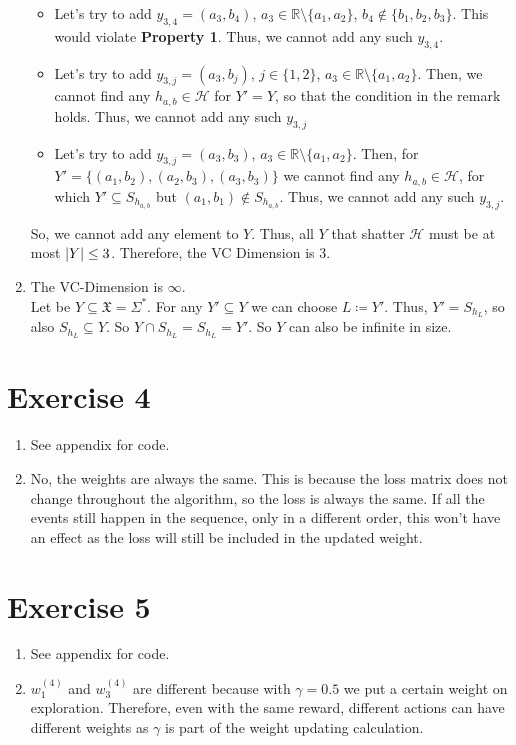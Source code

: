 \documentclass[12pt]{article}
\DeclarePairedDelimiter\abs{\lvert}{\rvert}
\begin{document}
\begin{enumerate}[label=(\alph*)]
\begin{itemize}
				\item	Let's try to add $y_{3,4} = (a_3, b_4)$, $a_3 \in \mathbb{R}\setminus\{a_1, a_2\}$, $b_4 \not\in \{b_1, b_2, b_3\}$. This would violate \textbf{Property 1}. Thus, we cannot add any such $y_{3,4}$.
				\item	Let's try to add $y_{3,j} = (a_3, b_j)$, $j \in \{1,2\}$, $a_3 \in \mathbb{R}\setminus\{a_1, a_2\}$. Then, we cannot find any $h_{a,b} \in \mathcal{H}$ for $Y' = Y$, so that the condition in the remark holds. Thus, we cannot add any such $y_{3,j}$
				\item	Let's try to add $y_{3,j} = (a_3, b_3)$, $a_3 \in \mathbb{R}\setminus\{a_1, a_2\}$. Then, for $Y' = \{(a_1, b_2), (a_2,b_3), (a_3, b_3)\}$ we cannot find any $h_{a,b} \in \mathcal{H}$, for which $Y' \subseteq S_{h_{a,b}}$ but $(a_1, b_1) \not\in S_{h_{a,b}}$. Thus, we cannot add any such $y_{3,j}$.
			\end{itemize}
			So, we cannot add any element to $Y$. Thus, all $Y$ that shatter $\mathcal{H}$ must be at most $\abs{Y} \leq 3$. Therefore, the VC Dimension is $3$.
	\item	The VC-Dimension is $\infty$. \\
			Let be $Y \subseteq \mathfrak{X} = \Sigma^*$. For any $Y' \subseteq Y$ we can choose $L \coloneqq Y'$. Thus, $Y' = S_{h_L}$, so also $S_{h_L} \subseteq Y$. So $Y \cap S_{h_L} = S_{h_L} = Y'$. So $Y$ can also be infinite in size.
\end{enumerate}

\section*{Exercise 4}
\begin{enumerate}[label= (\alph*)]
	\item See \refname{appendix} for code.
        
    \item No, the weights are always the same. This is because the loss matrix does not change throughout the algorithm, so the loss is always the same.
        If all the events still happen in the sequence, only in a different order, this won't have an effect as the loss will still be included in the updated weight.
\end{enumerate}

\section*{Exercise 5}
\begin{enumerate}[label=(\alph*)]
	\item See \refname{appendix} for code.
        
    \item \(w_1^{(4)}\) and \(w_3^{(4)}\) are different because with \(\gamma = 0.5\) we put a certain weight on exploration.
        Therefore, even with the same reward, different actions can have different weights as \(\gamma\) is part of the weight updating calculation.
\end{enumerate}
\end{document}
